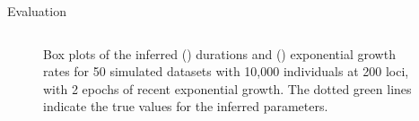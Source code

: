 \documentclass[final,hyperref={pdfpagelabels=false},professionalfonts,mathserif]{beamer}
\begin{document}
\begin{frame}[fragile]
\begin{columns}[t]
\begin{column}{.495\linewidth}
\begin{block}{\large Evaluation}
\begin{columns}[T]
\begin{column}{0.97\linewidth}
\begin{figure}[H]
\begin{subfigure}[b]{0.48\linewidth}
				    \end{subfigure}
				    \label{fig:inferred_params_2epochs}
				    \caption{
				    Box plots of the inferred (\protect{}) durations and (\protect{}) exponential growth rates for 50 simulated datasets with 10,000 individuals at 200 loci, with 2 epochs of recent exponential growth. The dotted green lines indicate the true values for the inferred parameters. %
				    }
				\end{figure}



\end{column}
\end{columns}
\end{block}
\end{column}
\end{columns}
\end{frame}
\end{document}
